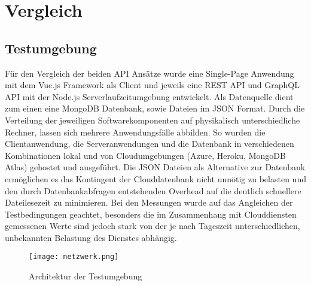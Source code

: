 \chapter{Vergleich}
\section{Testumgebung}
Für den Vergleich der beiden API Ansätze wurde eine Single-Page Anwendung mit dem Vue.js Framework als Client und jeweils eine REST API und GraphQL API mit der Node.js Serverlaufzeitumgebung entwickelt.
Als Datenquelle dient zum einen eine MongoDB Datenbank, sowie Dateien im JSON Format.
Durch die Verteilung der jeweiligen Softwarekomponenten auf physikalisch unterschiedliche Rechner, lassen sich mehrere Anwendungsfälle abbilden.
So wurden die Clientanwendung, die Serveranwendungen und die Datenbank in verschiedenen Kombinationen lokal und von Cloudumgebungen (Azure, Heroku, MongoDB Atlas) gehostet und ausgeführt.
Die JSON Dateien als Alternative zur Datenbank ermöglichen es das Kontingent der Clouddatenbank nicht unnötig zu belasten und den durch Datenbankabfragen entstehenden Overhead auf die deutlich schnellere Dateilesezeit zu minimieren.
Bei den Messungen wurde auf das Angleichen der Testbedingungen geachtet, besonders die im Zusammenhang mit Clouddiensten gemessenen Werte sind jedoch stark von der je nach Tageszeit unterschiedlichen, unbekannten Belastung des Dienstes abhängig.
\begin{figure}[h]
  \centering
  \texttt{[image: netzwerk.png]}
  \caption{Architektur der Testumgebung}\label{img:netzwerk}
\end{figure}
